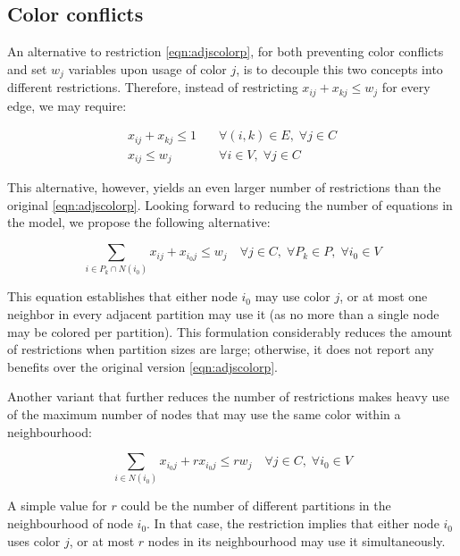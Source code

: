 \subsection{Color conflicts}
\label{subsec:model:colorconflicts}

An alternative to restriction \ref{eqn:adjscolorp}, for both preventing color conflicts and set $w_j$ variables upon usage of color $j$, is to decouple this two concepts into different restrictions. Therefore, instead of restricting $x_{ij} + x_{kj} \leq w_j$ for every edge, we may require:

\begin{align}
x_{ij} + x_{kj} \leq 1 \quad &\forall (i,k) \in E, \; \forall j \in C \label{eqn:adjscolorpone}\\
x_{ij} \leq w_{j} \quad &\forall i \in V, \; \forall j \in C \label{eqn:nodelessthanwj}
\end{align}

This alternative, however, yields an even larger number of restrictions than the original \ref{eqn:adjscolorp}. Looking forward to reducing the number of equations in the model, we propose the following alternative:

\begin{equation}
\label{eqn:adjsperpart}
\sum_{i \in P_k \cap N(i_0)} x_{ij} + x_{i_0j} \leq w_j \quad \forall j \in C, \; \forall P_k \in P, \; \forall i_0 \in V 
\end{equation}

This equation establishes that either node $i_0$ may use color $j$, or at most one neighbor in every adjacent partition may use it (as no more than a single node may be colored per partition). This formulation considerably reduces the amount of restrictions when partition sizes are large; otherwise, it does not report any benefits over the original version \ref{eqn:adjscolorp}.

Another variant that further reduces the number of restrictions makes heavy use of the maximum number of nodes that may use the same color within a neighbourhood:

\begin{equation}
\label{eqn:adjsneighb}
\sum_{i \in N(i_0)} x_{i_0j} + r x_{i_0j} \leq r w_j \quad \forall j \in C, \; \forall i_0 \in V 
\end{equation}

A simple value for $r$ could be the number of different partitions in the neighbourhood of node $i_0$. In that case, the restriction implies that either node $i_0$ uses color $j$, or at most $r$ nodes in its neighbourhood may use it simultaneously.

